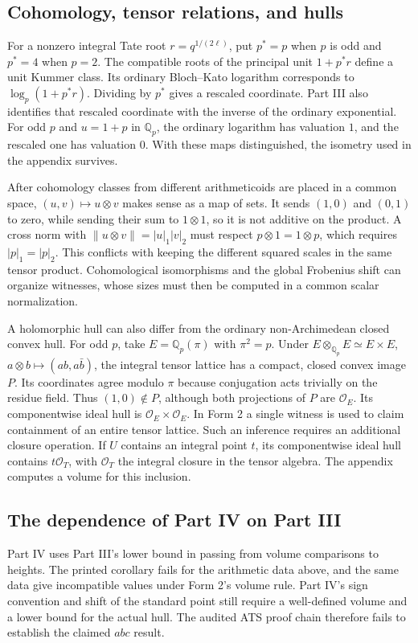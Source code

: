 \documentclass[UTF8,fontset=none,zihao=-4,a4paper]{ctexart}
\newcommand{\OO}{\mathcal O}
\newcommand{\Q}{\mathbb Q}
\begin{document}
\subsection{Cohomology, tensor relations, and hulls}
For a nonzero integral Tate root \(r=q^{1/(2\ell)}\), put \(p^*=p\) when \(p\) is odd and \(p^*=4\) when \(p=2\). The compatible roots of the principal unit \(1+p^*r\) define a unit Kummer class. Its ordinary Bloch--Kato logarithm corresponds to \(\log_p(1+p^*r)\). Dividing by \(p^*\) gives a rescaled coordinate. Part III also identifies that rescaled coordinate with the inverse of the ordinary exponential. For odd \(p\) and \(u=1+p\) in \(\Q_p\), the ordinary logarithm has valuation \(1\), and the rescaled one has valuation \(0\). With these maps distinguished, the isometry used in the appendix survives.\cite{jiii}

After cohomology classes from different arithmeticoids are placed in a common space, \((u,v)\mapsto u\otimes v\) makes sense as a map of sets. It sends \((1,0)\) and \((0,1)\) to zero, while sending their sum to \(1\otimes1\), so it is not additive on the product. A cross norm with \(\|u\otimes v\|=|u|_1|v|_2\) must respect \(p\otimes1=1\otimes p\), which requires \(|p|_1=|p|_2\). This conflicts with keeping the different squared scales in the same tensor product. Cohomological isomorphisms and the global Frobenius shift can organize witnesses, whose sizes must then be computed in a common scalar normalization.\cite{jhalf,jiii,jiv,janab,jalg}

A holomorphic hull can also differ from the ordinary non-Archimedean closed convex hull. For odd \(p\), take \(E=\Q_p(\pi)\) with \(\pi^2=p\). Under \(E\otimes_{\Q_p}E\simeq E\times E\), \(a\otimes b\mapsto(ab,a\bar b)\), the integral tensor lattice has a compact, closed convex image \(P\). Its coordinates agree modulo \(\pi\) because conjugation acts trivially on the residue field. Thus \((1,0)\notin P\), although both projections of \(P\) are \(\OO_E\). Its componentwise ideal hull is \(\OO_E\times\OO_E\). In Form 2 a single witness is used to claim containment of an entire tensor lattice. Such an inference requires an additional closure operation. If \(U\) contains an integral point \(t\), its componentwise ideal hull contains \(t\OO_T\), with \(\OO_T\) the integral closure in the tensor algebra. The appendix computes a volume for this inclusion.\cite{jiii}

\subsection{The dependence of Part IV on Part III}
Part IV uses Part III's lower bound in passing from volume comparisons to heights. The printed corollary fails for the arithmetic data above, and the same data give incompatible values under Form 2's volume rule. Part IV's sign convention and shift of the standard point still require a well-defined volume and a lower bound for the actual hull. The audited ATS proof chain therefore fails to establish the claimed \(abc\) result.\cite{jiii,jiv}
\end{document}
